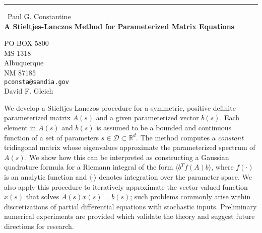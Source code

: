 \documentclass{report}
\begin{document}
\begin{center}
\rule{6in}{1pt} \
{\large Paul G. Constantine \\
{\bf A Stieltjes-Lanczos Method for Parameterized Matrix Equations}}

PO BOX 5800 \\ MS 1318 \\ Albuquerque \\ NM 87185
\\
{\tt pconsta@sandia.gov}\\
David F. Gleich\end{center}

We develop a Stieltjes-Lanczos procedure for a symmetric, positive
definite parameterized matrix $A(s)$ and a given
parameterized vector $b(s)$. Each element in $A(s)$ and $b(s)$ is assumed
to be a bounded and continuous
function of a set of parameters $s\in\mathcal{D}\subset\mathbb{R}^d$.
The method computes a \emph{constant} tridiagonal matrix whose
eigenvalues approximate the parameterized spectrum of
$A(s)$. We show how this can be interpreted as constructing a Gaussian
quadrature formula for a Riemann integral of the
form $\langle b^Tf(A)b \rangle$, where $f(\cdot)$ is an analytic function
and $\langle\cdot\rangle$ denotes
integration over the parameter space.
We also apply this procedure to iteratively approximate the vector-valued
function $x(s)$ that solves
$A(s)x(s)=b(s)$; such problems commonly arise within discretizations of
partial differential equations with
stochastic inputs. Preliminary numerical experiments are provided which
validate the theory and suggest future
directions for research.
\end{document}
